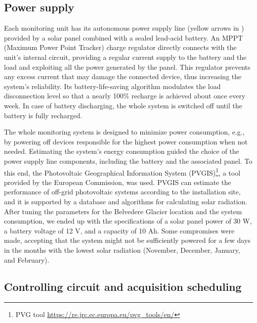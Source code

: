 \subsection{Power supply}\label{Power_supply}

Each monitoring unit has its autonomous power supply line (yellow arrows in ) provided by a solar panel combined with a sealed lead-acid
battery.
An MPPT (Maximum Power Point Tracker) charge regulator directly connects with the unit's internal circuit, providing a regular current supply to the battery
and the load and exploiting all the power generated by the panel.
This regulator prevents any excess current that may damage the connected device, thus increasing the system's reliability. 
Its battery-life-saving algorithm modulates the load disconnection level so that a nearly 100\% recharge is achieved about once every week. 
In case of battery discharging, the whole system is switched off until the battery is fully recharged.

The whole monitoring system is designed to minimize power consumption, e.g., by powering off devices responsible for the highest power consumption when not needed.
Estimating the system's energy consumption guided the choice of the power supply line components, including the battery and the associated panel. 
To this end, the Photovoltaic Geographical Information System (PVGIS)\footnote{PVG tool \url{https://re.jrc.ec.europa.eu/pvg_tools/en/}}, a tool provided by the European Commission, was used.
PVGIS can estimate the performance of off-grid photovoltaic systems according to the installation site, and it is supported by a database and algorithms for calculating solar radiation. 
After tuning the parameters for the Belvedere Glacier location and the system consumption, we ended up with the specifications of a solar panel power of 30 W, a battery voltage of 12 V, and a capacity of 10 Ah. 
Some compromises were made, accepting that the system might not be sufficiently powered for a few days in the months with the lowest solar radiation (November, December, January, and February). 

\subsection{Controlling circuit and acquisition scheduling}\label{Control}


